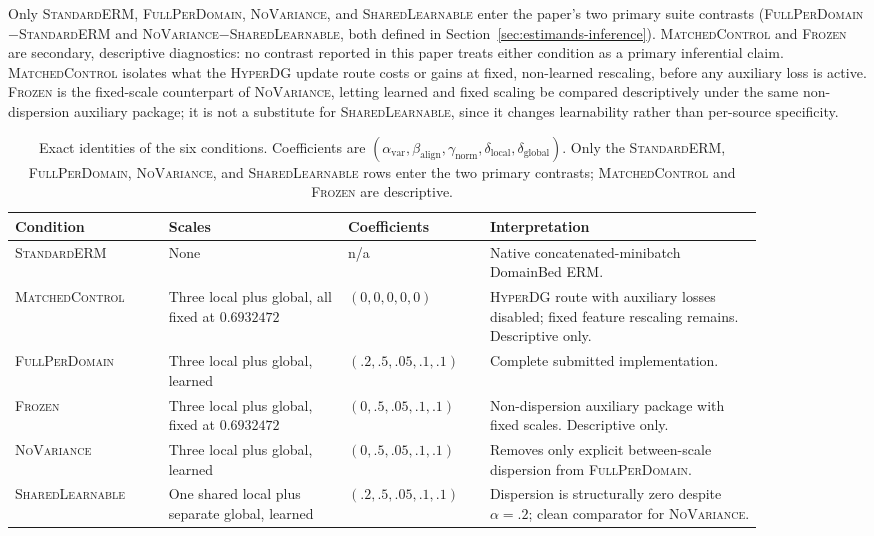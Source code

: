 \documentclass[10pt]{article}
\newcommand{\method}{\textsc{HyperDG}}
\newcommand{\full}{\textsc{FullPerDomain}}
\newcommand{\erm}{\textsc{StandardERM}}
\newcommand{\shared}{\textsc{SharedLearnable}}
\newcommand{\novar}{\textsc{NoVariance}}
\begin{document}
Only \erm{}, \full{}, \novar{}, and \shared{} enter the paper's two primary
suite contrasts (\full{}$-$\erm{} and \novar{}$-$\shared{}, both defined in
Section~\ref{sec:estimands-inference}). \textsc{MatchedControl} and \textsc{Frozen} are
secondary, descriptive diagnostics: no contrast reported in this paper treats
either condition as a primary inferential claim. \textsc{MatchedControl}
isolates what the \method{} update route costs or gains at fixed, non-learned
rescaling, before any auxiliary loss is active. \textsc{Frozen} is the
fixed-scale counterpart of \novar{}, letting learned and fixed scaling be
compared descriptively under the same non-dispersion auxiliary package; it is
not a substitute for \shared{}, since it changes learnability rather than
per-source specificity.

\begin{table}[H]
\centering
\caption{Exact identities of the six conditions. Coefficients are
$(\alpha_{\mathrm{var}},\beta_{\mathrm{align}},\gamma_{\mathrm{norm}},
\delta_{\mathrm{local}},\delta_{\mathrm{global}})$. Only the \erm{}, \full{},
\novar{}, and \shared{} rows enter the two primary contrasts;
\textsc{MatchedControl} and \textsc{Frozen} are descriptive.}
\label{tab:condition-identities}
\small
\setlength{\tabcolsep}{4pt}
\begin{tabular}{p{0.18\linewidth}p{0.21\linewidth}p{0.16\linewidth}p{0.32\linewidth}}
\toprule
Condition & Scales & Coefficients & Interpretation \\
\midrule
\erm{} & None & n/a & Native concatenated-minibatch DomainBed ERM. \\
\textsc{MatchedControl} & Three local plus global, all fixed at $0.6932472$ &
$(0,0,0,0,0)$ & \method{} route with auxiliary losses disabled; fixed feature
rescaling remains. Descriptive only. \\
\full{} & Three local plus global, learned &
$(.2,.5,.05,.1,.1)$ & Complete submitted implementation. \\
\textsc{Frozen} & Three local plus global, fixed at $0.6932472$ &
$(0,.5,.05,.1,.1)$ & Non-dispersion auxiliary package with fixed scales.
Descriptive only. \\
\novar{} & Three local plus global, learned &
$(0,.5,.05,.1,.1)$ & Removes only explicit between-scale dispersion from
\full{}. \\
\shared{} & One shared local plus separate global, learned &
$(.2,.5,.05,.1,.1)$ & Dispersion is structurally zero despite $\alpha=.2$;
clean comparator for \novar{}. \\
\bottomrule
\end{tabular}
\end{table}
\end{document}
